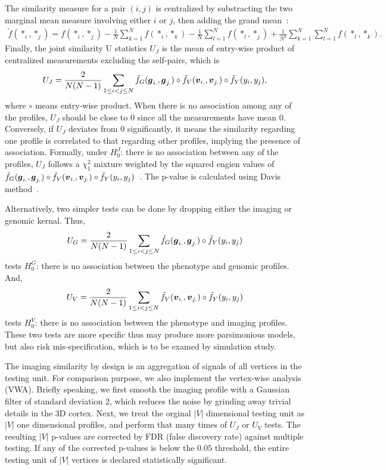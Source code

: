 The similarity measure for a pair $(i, j)$ is centralized by substracting the two marginal mean measure involving either $i$ or $j$, then adding the grand mean~\cite{UST1}:
\begin{align*}
  \tilde{f}(*_i, *_j) = f(*_i, *_j)-\frac{1}{N} \sum_{k=1}^N{f(*_i, *_k)}-\frac{1}{N}\sum_{l=1}^N{f(*_l, *_j)} + \frac{1}{N^2} \sum_{k=1}^{N} \sum_{l=1}^{N} {f(*_l, *_k)}.
\end{align*}
Finally, the joint similarity U statistics $U_J$ is the mean of entry-wise product of centralized measurements excluding the self-pairs, which is
\[ U_J = \frac{2}{N(N-1)} \sum_{1 \leq i < j \leq N}^{} \tilde{f}_G(\boldsymbol{g}_{i.}, \boldsymbol{g}_{j.}) \circ \tilde{f}_V(\boldsymbol{v}_{i.}, \boldsymbol{v}_{j.}) \circ \tilde{f}_Y(y_i, y_j), \]
where $\circ$ means entry-wise product. When there is no association among any of the profiles, $U_J$ should be close to $0$ since all the measurements have mean $0$. Conversely, if $U_J$ deviates from $0$ significantly, it means the similarity regarding one profile is correlated to that regarding other profiles, implying the presence of association. Formally, under $H_0^J$: there is no association between any of the profiles, $U_J$ follows a $\chi_1^2$ mixture weighted by the squared engien values of $\tilde{f}_G(\boldsymbol{g}_{i.}, \boldsymbol{g}_{j.}) \circ \tilde{f}_V(\boldsymbol{v}_{i.}, \boldsymbol{v}_{j.}) \circ \tilde{f}_Y(y_i, y_j)$~\cite{UST1, UST2}. The p-value is calculated using Davis method~\cite{davies80}.

Alternatively, two simpler tests can be done by dropping either the imaging or genomic kernal. Thus,
\[ U_G = \frac{2}{N(N-1)} \sum_{1 \leq i < j \leq N}^{} \tilde{f}_G(\boldsymbol{g}_{i.}, \boldsymbol{g}_{j.}) \circ \tilde{f}_Y(y_i, y_j) \]
tests $H_0^G$: there is no association between the phenotype and genomic profiles. And,
\[ U_V = \frac{2}{N(N-1)} \sum_{1 \leq i < j \leq N}^{} \tilde{f}_V(\boldsymbol{v}_{i.}, \boldsymbol{v}_{j.}) \circ \tilde{f}_Y(y_i, y_j) \]
tests $H_0^V$: there is no association between the phenotype and imaging profiles. These two tests are more specific thus may produce more parsimonious models, but also risk mis-specification, which is to be examed by simulation study.

The imaging similarity by design is an aggregation of signals of all vertices in the testing unit. For comparison purpose, we also implement the vertex-wise analysis (VWA). Briefly speaking, we first smooth the imaging profile with a Gaussian filter of standard deviation 2, which reduces the noise by grinding away trivial details in the 3D cortex. Next, we treat the orginal $|V|$ dimensional testing unit as $|V|$ one dimensional profiles, and perform that many times of $U_J$ or $U_V$ tests. The resulting $|V|$ p-values are corrected by FDR (false discovery rate) against multiple testing. If any of the corrected p-values is below the $0.05$ threshold, the entire testing unit of $|V|$ vertices is declared statistically significant.
